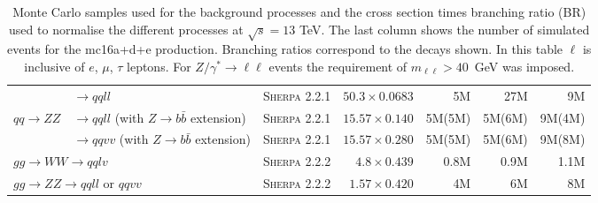 \begin{table}[tbph]
{\begin{tabular}{lp{5 cm}lrrrr}
                                            & $\rightarrow qqll$ & \textsc{Sherpa 2.2.1} & $50.3\times0.0683$ & 5M & 27M & 9M \\
    $qq\rightarrow ZZ$ & $\rightarrow qqll$ (with $Z\rightarrow b\bar{b}$ extension) & \textsc{Sherpa 2.2.1} & $15.57\times0.140$ & 5M(5M)  & 5M(6M) & 9M(4M) \\
                                            & $\rightarrow qqvv$ (with $Z\rightarrow b\bar{b}$ extension) & \textsc{Sherpa 2.2.1} & $15.57\times0.280$ & 5M(5M)  & 5M(6M) & 9M(8M) \\
    \multicolumn{2}{l}{$gg\rightarrow WW \rightarrow qqlv$} & \textsc{Sherpa 2.2.2} & $4.8\times0.439$ & 0.8M & 0.9M & 1.1M \\
    \multicolumn{2}{l}{$gg\rightarrow ZZ \rightarrow qqll$ or $qqvv$} & \textsc{Sherpa 2.2.2} & $1.57\times0.420$ & 4M & 6M & 8M \\
    \bottomrule
  \end{tabular}
}
\caption{Monte Carlo samples used for the background processes and the cross
  section times branching ratio (BR) used to normalise the different processes
  at $\sqrt{s}=13$ TeV. The last column shows the number of simulated events for
  the {mc16a+d+e} production. Branching ratios correspond to the decays shown.
  In this table $\ell$ is inclusive of $e$, $\mu$, $\tau$ leptons. For
  $Z/\gamma^{*} \to \ell\ell$ events the requirement of $m_{\ell\ell}>40$~GeV
  was imposed.
}
\label{tbl:bkgMC}
\end{table}

